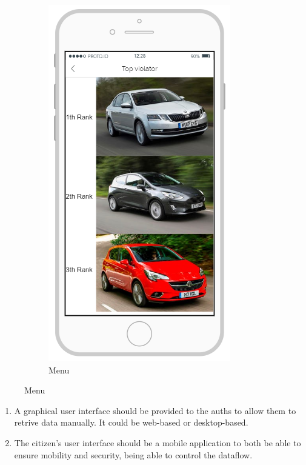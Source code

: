 \documentclass{article}
\newcommand{\enum}[1]{\texttt{#1.\arabic*}}
\begin{document}
\begin{figure}[H]
\begin{subfigure}[H]{0.25\linewidth}
					\includegraphics[width=\linewidth]{Images/Top_Violators.png}
					\caption{Menu}
				\end{subfigure}
			\end{figure}				
			\newpage	
		
			\begin{enumerate}[label=\enum{UI}]
				\item \label{UI:authority}A graphical user interface should be provided to the auths to allow them to retrive data manually. It could be web-based or desktop-based.
				\item \label{UI:citizen}The citizen's user interface should be a mobile application to both be able to ensure mobility and security, being able to control the dataflow.
			\end{enumerate}
			
\end{document}
